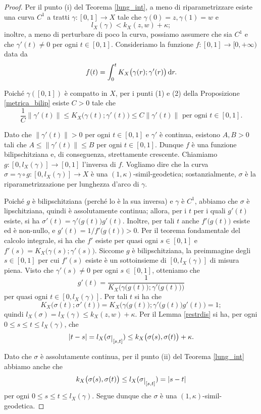 \begin{proof}
    Per il punto (i) del Teorema \ref{lung_int}, a meno di riparametrizzare esiste una curva $C^1$ a tratti $\gamma:[0,1] \longrightarrow X$ tale che $\gamma(0)=z,\gamma(1)=w$ e
    $$l_X(\gamma)<k_X(z,w)+\kappa;$$
    inoltre, a meno di perturbare di poco la curva, possiamo assumere che sia $C^1$ e che $\gamma'(t)\not=0$ per ogni $t\in[0,1]$. Consideriamo la funzione $f:[0,1] \longrightarrow [0,+\infty)$ data da
    $$f(t)=\int_0^t K_X\big(\gamma(r);\gamma'(r)\big)\mathop{}\!\mathrm{d} r.$$

    Poiché $\gamma([0,1])$ è compatto in $X$, per i punti (1) e (2) della Proposizione \ref{metrica_bilip} esiste $C>0$ tale che
    $$\frac{1}{C}\|\gamma'(t)\| \le K_X\big(\gamma(t);\gamma'(t)\big) \le C\|\gamma'(t)\|\text{ per ogni }t\in[0,1].$$

    Dato che $\|\gamma'(t)\|>0$ per ogni $t\in[0,1]$ e $\gamma'$ è continua, esistono $A,B>0$ tali che $A \le \|\gamma'(t)\|\le B$ per ogni $t\in[0,1]$. Dunque $f$ è una funzione bilipschitziana e, di conseguenza, strettamente crescente. Chiamiamo $g:[0,l_X(\gamma)] \longrightarrow [0,1]$ l'inversa di $f$. Vogliamo dire che la curva $\sigma=\gamma\circ g:[0,l_X(\gamma)] \longrightarrow X$ è una $(1,\kappa)$-simil-geodetica; sostanzialmente, $\sigma$ è la riparametrizzazione per lunghezza d'arco di $\gamma$.

    Poiché $g$ è bilipschitziana (perché lo è la sua inversa) e $\gamma$ è $C^1$, abbiamo che $\sigma$ è lipschitziana, quindi è assolutamente continua; allora, per i $t$ per i quali $g'(t)$ esiste, si ha $\sigma'(t)=\gamma'\big(g(t)\big)g'(t)$. Inoltre, per tali $t$ anche $f'\big(g(t)\big)$ esiste ed è non-nullo, e $g'(t)=1/f'\big(g(t)\big)>0$. Per il teorema fondamentale del calcolo integrale, si ha che $f'$ esiste per quasi ogni $s\in[0,1]$ e $f'(s)=K_X\big(\gamma(s);\gamma'(s)\big)$. Siccome $g$ è bilipschitziana, la preimmagine degli $s\in[0,1]$ per cui $f'(s)$ esiste è un sottoinsieme di $[0,l_X(\gamma)]$ di misura piena. Visto che $\gamma'(s)\not=0$ per ogni $s\in[0,1]$, otteniamo che
    $$g'(t)=\frac{1}{K_X\Big(\gamma\big(g(t)\big);\gamma'\big(g(t)\big)\Big)}$$
    per quasi ogni $t\in[0,l_X(\gamma)]$. Per tali $t$ si ha che
    $$K_X\big(\sigma(t);\sigma'(t)\big)=K_X\Big(\gamma\big(g(t)\big);\gamma'\big(g(t)\big)g'(t)\Big)=1;$$
    quindi $l_X(\sigma)=l_X(\gamma) \le k_X(z,w)+\kappa$. Per il Lemma \ref{restrdis} si ha, per ogni $0 \le s \le t \le l_X(\gamma)$, che
    $$|t-s|=l_X(\sigma\restrict{[s,t]}) \le k_X\big(\sigma(s),\sigma(t)\big)+\kappa.$$

    Dato che $\sigma$ è assolutamente continua, per il punto (ii) del Teorema \ref{lung_int} abbiamo anche che
    $$k_X\big(\sigma(s),\sigma(t)\big) \le l_X(\sigma\restrict{[s,t]})=|s-t|$$
    per ogni $0 \le s \le t \le l_X(\gamma)$. Segue dunque che $\sigma$ è una $(1,\kappa)$-simil-geodetica.
\end{proof}


